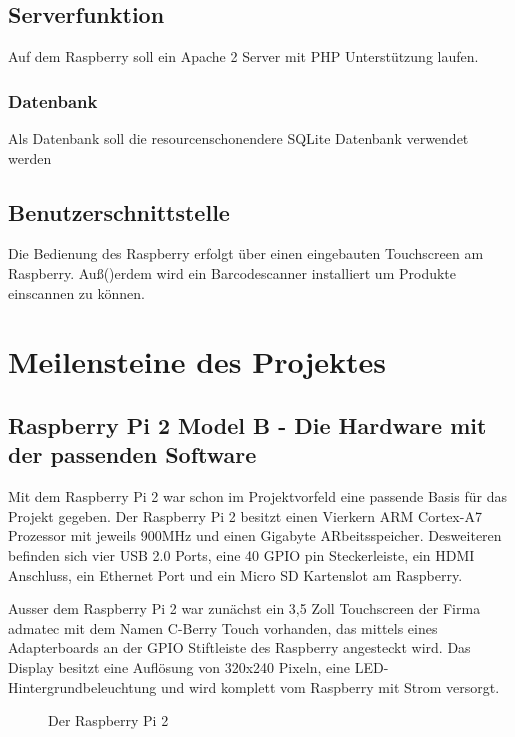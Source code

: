 \documentclass[11pt,a4paper]{article} %
\begin{document}
\subsection{Serverfunktion}
Auf dem Raspberry soll ein Apache 2 Server mit PHP Unterst\"utzung laufen.
\subsubsection{Datenbank}
Als Datenbank soll die resourcenschonendere SQLite Datenbank verwendet werden

\subsection{Benutzerschnittstelle}
Die Bedienung des Raspberry erfolgt \"uber einen eingebauten Touchscreen am Raspberry. Au\ss()erdem wird ein Barcodescanner installiert um Produkte einscannen zu k\"onnen.




\section{Meilensteine des Projektes}
\label{Meilensteine}

\subsection{Raspberry Pi 2 Model B - Die Hardware mit der passenden Software}
Mit dem Raspberry Pi 2 war schon im Projektvorfeld eine passende Basis f\"ur das Projekt gegeben. Der Raspberry Pi 2 besitzt einen Vierkern ARM Cortex-A7 Prozessor mit jeweils 900MHz und einen Gigabyte ARbeitsspeicher. Desweiteren befinden sich vier USB 2.0 Ports, eine 40 GPIO pin Steckerleiste, ein HDMI Anschluss, ein Ethernet Port und ein Micro SD Kartenslot am Raspberry.
\par
Ausser dem Raspberry Pi 2 war zun\"achst ein 3,5 Zoll Touchscreen der Firma admatec mit dem Namen C-Berry Touch vorhanden, das mittels eines Adapterboards an der GPIO Stiftleiste des Raspberry angesteckt wird. Das Display besitzt eine Aufl\"osung von 320x240 Pixeln, eine LED- Hintergrundbeleuchtung und wird komplett vom Raspberry mit Strom versorgt.

	\begin{figure}[h]
	\caption{Der Raspberry Pi 2}
	\end{figure}
\newpage
\par
\end{document}
